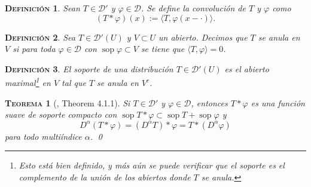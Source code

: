 \documentclass[11pt]{article}
\theoremstyle{colored}
\DeclareMathOperator{\sop}{sop}
\newtheorem{definition}{\scshape Definición}
\newtheorem{theorem}{\scshape Teorema}
\newcommand{\test}{\mathscr{D}}
\newcommand{\dist}{\test'}
\newcommand{\ev}[1]{\langle #1 \rangle}
\begin{document}
\begin{definition} Sean $T \in \dist$ y $\varphi \in \test$. Se define la \textit{convolución} de $T$ y $\varphi$ como
\[
(T \ast \varphi)(x) := \ev{T,\varphi(x - \cdot)}.
\]
\end{definition}

\begin{definition} Sea $T \in \dist(U)$ y $V \subset U$ un abierto. Decimos que $T$ se anula en $V$ si para toda $\varphi \in \test$ con $\sop \varphi \subset V$ se tiene que $\ev{T,\varphi} = 0$.
\end{definition}

\begin{definition} El \textit{soporte} de una distribución $T \in \dist(U)$ es el abierto maximal\footnote{Esto está bien definido, y más aún se puede verificar que el soporte es el complemento de la unión de los abiertos donde $T$ se anula.} en $V$ tal que $T$ se anula en $V^c$. 
\end{definition}

\begin{theorem}[\cite{H}, Theorem 4.1.1]  Si $T \in \dist$ y $\varphi \in \test$, entonces $T \ast \varphi$ es una función suave de soporte compacto con $\sop T \ast \varphi \subset \sop T + \sop \varphi$ y
\[
D^\alpha (T \ast \varphi ) = (D^\alpha T) \ast \varphi = T \ast (D^\alpha \varphi)
\]
para todo multiíndice $\alpha$. \qed
\end{theorem}

\scshape
\begin{thebibliography}{}
\normalfont
{}
\end{thebibliography}
\end{document}
